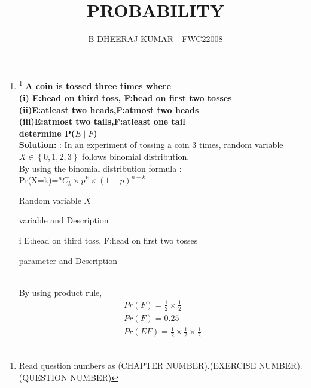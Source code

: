 \documentclass{article}
\providecommand{\cbrak}[1]{\ensuremath{\left\{#1\right\}}}
\newcommand{\solution}{\noindent \textbf{Solution: }}
\begin{document}
\title{PROBABILITY}
\author{\Large B DHEERAJ KUMAR - FWC22008}
\date{}

\maketitle
\begin{enumerate}[label=13.\arabic{enumi}.\arabic{enumii}]%
\setcounter{enumi}{0}
\setcounter{enumii}{6}

\item \footnote{Read question numbers as (CHAPTER NUMBER).(EXERCISE NUMBER).(QUESTION NUMBER)}
\textbf {A coin is tossed three times where \\
(i) E:head on third toss, F:head on first two tosses\\
(ii)E:atleast two heads,F:atmost two heads\\
(iii)E:atmost two tails,F:atleast one tail\\
determine P($E \mid F$) }\\[1ex]
\solution:
In an experiment of tossing a coin 3 times, random variable $X \in \cbrak{0,1,2,3}$ follows binomial distribution.\\
By using the binomial distribution formula :\\
Pr(X=k)=$^{n}C_k \times p^k \times (1-p)^{n-k}$\\
\vspace{5mm}
\begin{table}[h]
\centering

\caption{Random variable $X$}
\label{tab:5} 
\end{table}
\begin{table}[h]
\centering
	
\caption{variable and Description}
\label{tab:2} 
\end{table}
\item[i] E:head on third toss, F:head on first two tosses\\
\begin{table}[h]
\centering
	
\caption{parameter and Description}
\label{tab:2} 
\end{table}
\\
By using product rule,\\
\begin{align}
Pr(F)=\frac{1}{2}\times\frac{1}{2}\\
Pr(F)=0.25\\
Pr(EF)=\frac{1}{2}\times\frac{1}{2}\times\frac{1}{2}\\

\end{align}
\end{enumerate}
\end{document}
